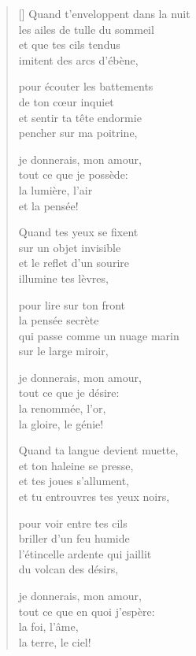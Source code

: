 \documentclass[a4paper,12pt]{book}
\begin{document}
\begin{verse}[\versewidth]
  Quand t'enveloppent dans la nuit \\
  les ailes de tulle du sommeil \\
  et que tes cils tendus \\
  imitent des arcs d'ébène,

  pour écouter les battements \\
  de ton cœur inquiet \\
  et sentir ta tête endormie \\
  pencher sur ma poitrine,

  je donnerais, mon amour, \\
  tout ce que je possède: \\
  la lumière, l'air \\
  et la pensée!

  Quand tes yeux se fixent \\
  sur un objet invisible \\
  et le reflet d'un sourire \\
  illumine tes lèvres,

  pour lire sur ton front \\
  la pensée secrète \\
  qui passe comme un nuage marin \\
  sur le large miroir,

  je donnerais, mon amour, \\
  tout ce que je désire: \\
  la renommée, l'or, \\
  la gloire, le génie!

  Quand ta langue devient muette, \\
  et ton haleine se presse, \\
  et tes joues s'allument, \\
  et tu entrouvres tes yeux noirs,

  pour voir entre tes cils \\
  briller d'un feu humide \\
  l'étincelle ardente qui jaillit \\
  du volcan des désirs,

  je donnerais, mon amour, \\
  tout ce que en quoi j'espère: \\
  la foi, l'âme, \\
  la terre, le ciel!
\end{verse}

\bigskip
\end{document}
